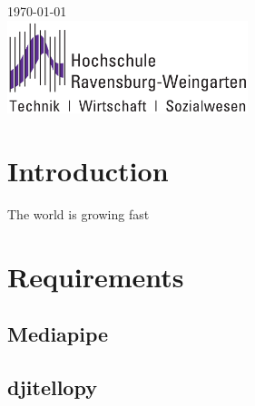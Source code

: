 \documentclass[a4paper,11pt,singlespacing]{article}
\begin{document}
\begin{titlepage}
	
	
	{\large \today}\\[5cm] %
	
	
	
	\includegraphics[width=7cm]{images/logo.png} %
	
	
	\vfill %
	
\end{titlepage}


\tableofcontents
\pagebreak



\section{Introduction}
The world is growing fast

\cite{tello_idea}

\section{Requirements}
\subsection{Mediapipe}
\subsection{djitellopy}
\end{document}
